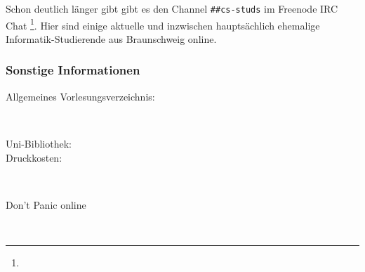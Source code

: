 		Schon deutlich länger gibt gibt es den Channel \texttt{\#\#cs-studs} im Freenode IRC Chat \footnote{}. Hier sind einige aktuelle und inzwischen hauptsächlich ehemalige Informatik-Studierende aus Braunschweig online. 




\subsubsection*{Sonstige Informationen}
	\begin{description}
		\item[Allgemeines Vorlesungsverzeichnis:] ~\\
			{\footnotesize{}}
		\item[Uni-Bibliothek:] 
			{\footnotesize{}}
		\item[Druckkosten:] ~\\
			{\footnotesize{}}
		\item[Don't Panic online] ~\\
			{\footnotesize{}}
	\end{description}
